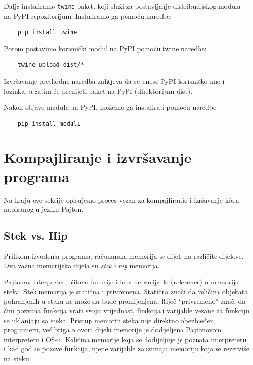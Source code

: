 Dalje instaliramo \texttt{twine} paket, koji služi za postavljanje distr\-ibucijskog modula na PyPI repozitorijum. Instaliramo ga pomoću   naredbe:
\begin{verbatim}
	pip install twine
\end{verbatim}
Potom postavimo korisnički   modul na PyPI pomoću twine naredbe:
\begin{verbatim}
	twine upload dist/*
\end{verbatim}
Izvršavanje prethodne naredba zahtjeva da se unese PyPI korisničko ime i lozinka, a zatim će prenijeti      paket na PyPI (direktorijum dist).

Nakon  objave  modula na PyPI, možemo ga instalirati pomoću   naredbe:
\begin{verbatim}
	pip install modul1
\end{verbatim}

\section{Kompajliranje i izvršavanje programa}

Na kraju ove sekcije opisujemo proces vezan za kompajliranje i izršavanje k\^oda napisanog u jeziku Pajton. %
\subsection{Stek vs. Hip} 


Prilikom izvođenja programa, računarska memorija se dijeli na različite dijelove. Dva važna memorijska dijela su \textit{stek} i \textit{hip} memorija. 

Pajtonov interpreter učitava funkcije i lokalne varijable (reference) u me\-moriju steka. 
Stek memorija je statična i privremena. Statična znači da veličina objekata pohranjenih u steku ne može da bude promije\-njena. Riječ ``privremeno'' znači da čim pozvana funkcija vrati svoju vrijednost, funkcija i   varijable vezane za funkciju se uklanjaju sa steka. Pristup memoriji steka nije direktno obezbjeđen programeru, već  briga o ovom dijelu memorije je dodijeljena Pajtonovom interpreteru i OS-u.  Količina memorije koja  se dodijeljuje je poznata interpreteru i kad god se pozove funkcija, njene varijable zauzimaju memoriju koja se rezerviše na steku.

